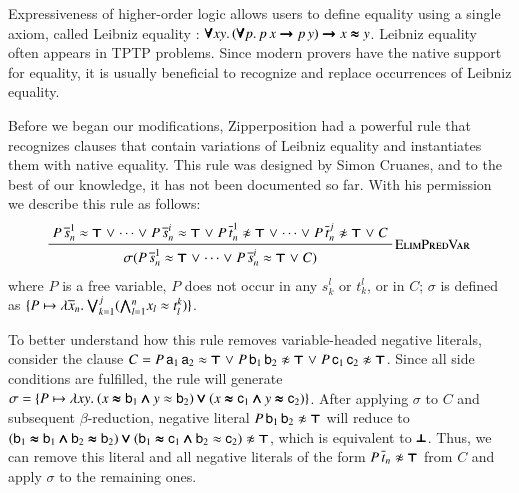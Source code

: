 Expressiveness of higher-order logic allows users to define equality using a single axiom,
called Leibniz equality \cite{pa-01-classical-ty-thy}:
%
$ \pmb{\forall} xy. \,
   (\pmb{\forall} p. \, p \, x \pmb{\rightarrow} p \, y) \pmb{\rightarrow} x \pmb{\approx} y$.
%
Leibniz equality often appears in TPTP problems. Since modern provers have the native support
for equality, it is usually beneficial to recognize and replace occurrences of Leibniz equality.

Before we began our modifications, Zipperposition had a powerful rule that
recognizes clauses that contain variations of Leibniz equality and instantiates
them with native equality. This rule was designed by Simon Cruanes, and to the
best of our knowledge, it has not been documented so far. With his permission
we describe this rule as follows:
\pagebreak[2]
%
$$\namedinference{ElimPredVar}{P \, \overline{s}_n^1 \eq \itrue \llor \cdots \llor
    P \, \overline{s}_n^i \eq \itrue \llor P \, \overline{t}_n^1 \noteq \itrue \llor
    \cdots \llor P \, \overline{t}_n^j \noteq \itrue \llor C} 
    {\sigmacl{P \, \overline{s}_n^1
    \eq \itrue \llor \cdots \llor P \, \overline{s}_n^i \eq \itrue  \llor C}} $$
where $P$ is a free variable, $P$ does not occur in any $s_k^l$ or $t_k^l$, or
in $C$; $\sigma$ is defined as $\{ P \mapsto \lambda \overline{x}_{n}.\> \pmb{\bigvee}_{k=1}^{j}
(\pmb{\bigwedge}_{l=1}^{n} x_l \approx t^k_l )  \}$. 

To better understand how this rule removes variable-headed negative literals,
consider the clause $C = P \, \mathsf{a}_1 \, \mathsf{a}_2 \approx \pmb{\top} \mathrel\lor P \,
\mathsf{b}_1 \, \mathsf{b}_2 \not\approx \pmb{\top} \mathrel\lor P \, \mathsf{c}_1 \, \mathsf{c}_2 \not\approx
\pmb{\top}$. Since all side conditions are fulfilled, the rule 
will generate $\sigma = \{ P \mapsto \lambda xy.\> (x \pmb{\approx} \mathsf{b}_1
\pmb{\land} y \approx \mathsf{b}_2) \pmb{\lor} (x \pmb{\approx} \mathsf{c}_1 \pmb{\land} y \pmb{\approx} \mathsf{c}_2)   \}$.
After applying $\sigma$ to $C$ and subsequent $\beta$-reduction, negative literal
$  P \, \mathsf{b}_1 \, \mathsf{b}_2 \not\approx \pmb{\top}$ will reduce to 
$ (\cst{b}_1 \ieq \cst{b}_1 \iand \cst{b}_2 \ieq \cst{b}_2) \ior (\cst{b}_1 \ieq \cst{c}_1 \iand \cst{b}_2 \eq \cst{c}_2) \noteq \itrue $,
which is equivalent to $\pmb{\bot}$. Thus, we can remove this literal and all negative literals
of the form $P \, \overline{t}_n \noteq \itrue$ from $C$ and apply $\sigma$ to the remaining ones.

